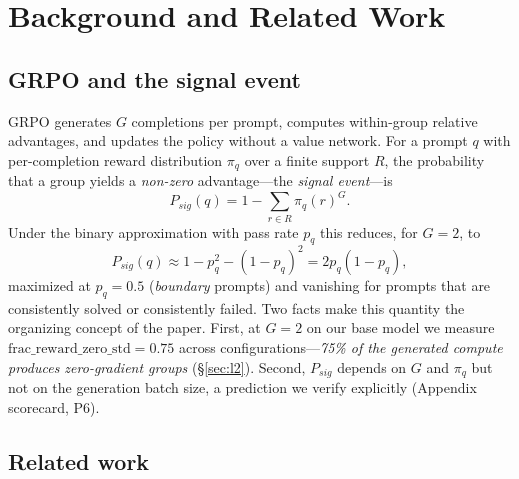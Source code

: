 \documentclass[11pt]{article}
\theoremstyle{definition}
\begin{document}
\section{Background and Related Work}\label{sec:bg}

\subsection{GRPO and the signal event}\label{sec:bg-grpo}
GRPO generates $G$ completions per prompt, computes within-group relative
advantages, and updates the policy without a value network. For a prompt $q$ with
per-completion reward distribution $\pi_q$ over a finite support $R$, the
probability that a group yields a \emph{non-zero} advantage---the \emph{signal
event}---is
\begin{equation}\label{eq:psig-exact}
P_{sig}(q) = 1 - \sum_{r \in R} \pi_q(r)^{G}.
\end{equation}
Under the binary approximation with pass rate $p_q$ this reduces, for $G{=}2$, to
\begin{equation}\label{eq:psig-binary}
P_{sig}(q) \approx 1 - p_q^{2} - (1-p_q)^{2} = 2p_q(1-p_q),
\end{equation}
maximized at $p_q{=}0.5$ (\emph{boundary} prompts) and vanishing for prompts that
are consistently solved or consistently failed. Two facts make this quantity the
organizing concept of the paper. First, at $G{=}2$ on our base model we measure
$\text{frac\_reward\_zero\_std}{=}0.75$ across configurations---\emph{75\% of the
generated compute produces zero-gradient groups} (\S\ref{sec:l2}). Second,
$P_{sig}$ depends on $G$ and $\pi_q$ but not on the generation batch size, a
prediction we verify explicitly (Appendix scorecard, P6).

\subsection{Related work}\label{sec:bg-related}
\end{document}
